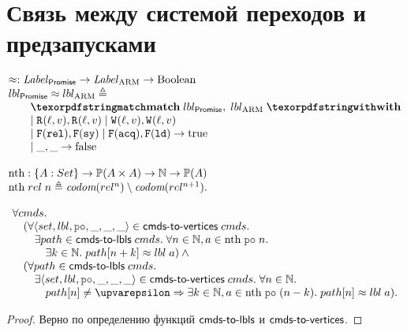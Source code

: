 \section{Связь между системой переходов и предзапусками}
\label{sec:lts-rel}

\[\inarr{
  \approx : \Label_{\Promise} \rightarrow \Label_{\ARM} \rightarrow {\rm Boolean} \\
  lbl_{\Promise} \approx lbl_{\ARM} \defeq \\
  \qquad \kw{match} \; lbl_{\Promise}, \; lbl_{\ARM} \; \kw{with} \\
  \qquad
    \begin{array}{@{}l}
      \mid \rlab{}{\loc}{\val}, \rlab{}{\loc}{\val}
      \mid \wlab{}{\loc}{\val}, \wlab{}{\loc}{\val} \\
      \mid \flab{\rel}, \flab{\SY}
      \mid \flab{\acq}, \flab{\LD} \rightarrow {\rm true} \\
      \mid \_, \_ \rightarrow {\rm false}
    \end{array} \\
  \\
  \nthf : \{A : Set\} \rightarrow \Pset(A \times A) \rightarrow \mathbb{N} \rightarrow \Pset(A) \\
  \nthf \; rel \; n \defeq \codom{rel^{n}} \setminus \codom{rel^{n + 1}}.
}\]

\begin{theorem}
\[\inarr{
\forall \Carm. \\
\quad (\forall \tup{set, lbl, \lPO, \_, \_, \_} \in \cmdsToVrtxs \; \Carm. \\
\qquad \exists path \in \cmdsToLbls \; \Carm. \; \forall n \in \mathbb{N}, a \in \nthf \; \lPO \; n. \\
\qquad \quad \exists k \in \mathbb{N}. \; path[n + k] \approx lbl \; a) \land {} \\
\quad (\forall path \in \cmdsToLbls \; \Carm. \\
\qquad \exists \tup{set, lbl, \lPO, \_, \_, \_} \in \cmdsToVrtxs \; \Carm. \;
  \forall n \in \mathbb{N}. \\
\qquad \quad path[n] \neq \epsilon \Rightarrow \exists k \in \mathbb{N}, a \in \nthf \; \lPO \; (n - k). \; path[n] \approx lbl \; a).
}\]
\end{theorem}
\begin{proof}
  Верно по определению функций $\textup{\sf cmds-to-lbls}$ и $\textup{\sf cmds-to-vertices}$.
\end{proof}

